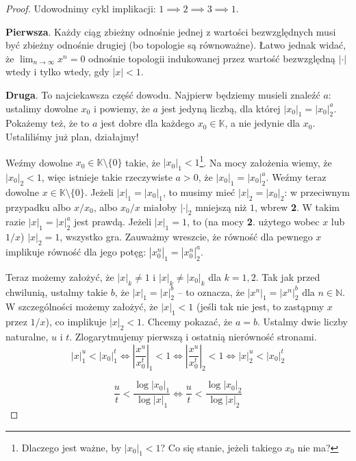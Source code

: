 \documentclass[a4paper,fleqn,9pt]{extarticle}
\begin{document}
\begin{proof}
Udowodnimy cykl implikacji: $1 \implies 2 \implies 3 \implies 1$.

\textbf{Pierwsza}. Każdy ciąg zbieżny odnośnie jednej z wartości bezwzględnych musi być zbieżny odnośnie drugiej (bo topologie są równoważne).
Łatwo jednak widać, że $\lim_{n\rightarrow \infty} x^n = 0$ odnośnie topologii indukowanej przez wartość bezwzględną $|\cdot|$ wtedy i tylko wtedy, gdy $|x|<1$.

\textbf{Druga}.
To najciekawsza część dowodu.
Najpierw będziemy musieli znaleźć $a$: ustalimy dowolne $x_0$ i powiemy, że $a$ jest jedyną liczbą, dla której $|x_0|_1 = |x_0|_2^a$.
Pokażemy też, że to $a$ jest dobre dla każdego $x_0 \in \mathbb K$, a nie jedynie dla $x_0$.
Ustaliliśmy już plan, działajmy!

Weźmy dowolne $x_0\in\mathbb K\setminus\{0\}$ takie, że $|x_0|_1 < 1$\footnote{Dlaczego jest ważne, by $|x_0|_1 < 1$? Co się stanie, jeżeli takiego $x_0$ nie ma?}.
Na mocy założenia wiemy, że $|x_0|_2 < 1$, więc istnieje takie rzeczywiste $a > 0$, że $|x_0|_1 = |x_0|_2^a$.
Weźmy teraz dowolne $x\in\mathbb K\setminus\{0\}$.
Jeżeli $|x|_1 = |x_0|_1$, to musimy mieć $|x|_2 = |x_0|_2$: w przeciwnym przypadku albo $x/x_0$, albo $x_0/x$ miałoby $|\cdot|_2$ mniejszą niż $1$, wbrew \textbf{2}.
W takim razie $|x|_1 = |x|_2^a$ jest prawdą.
Jeżeli $|x|_1 = 1$, to (na mocy \textbf{2}. użytego wobec $x$ lub $1/x$) $|x|_2 = 1$, wszystko gra.
Zauważmy wreszcie, że równość dla pewnego $x$ implikuje równość dla jego potęg: $|x_0^n|_1 = |x_0^n|_2^a$.

Teraz możemy założyć, że $|x|_k \neq 1$ i $|x|_k \neq |x_0|_k$ dla $k = 1,2$.
Tak jak przed chwilunią, ustalmy takie $b$, że $|x|_1 = |x|_2^b$ -- to oznacza, że $|x^n|_1 = |x^n|_2^b$ dla $n\in\mathbb N$.
W szczególności możemy założyć, że $|x|_1 < 1$ (jeśli tak nie jest, to zastąpmy $x$ przez $1/x$), co implikuje $|x|_2 < 1$.
Chcemy pokazać, że $a = b$.
Ustalmy dwie liczby naturalne, $u$ i $t$.
Zlogarytmujemy pierwszą i ostatnią nierówność stronami.
\begin{equation*}
|x|_1^u < |x_0|_1^t \iff
\left|\frac{x^u}{x_0^t}\right|_1 < 1 \iff
\left|\frac{x^u}{x_0^t}\right|_2 < 1 \iff
|x|_2^u < |x_0|_2^t
\end{equation*}

\begin{equation*}
\frac{u}{t} < \frac{\log |x_0|_1}{\log |x|_1} \iff
\frac{u}{t} < \frac{\log |x_0|_2}{\log |x|_2}
\end{equation*}


\end{proof}
\end{document}

